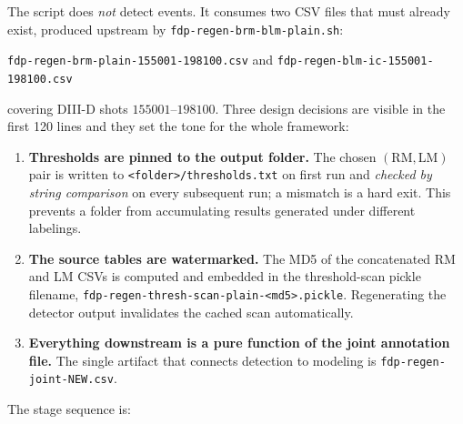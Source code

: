 \documentclass[11pt,a4paper]{article}
\newcommand{\code}[1]{\texttt{\small #1}}
\newcommand{\bk}{\discretionary{}{}{}}   %
\begin{document}
The script does \emph{not} detect events. It consumes two CSV files that must already exist,
produced upstream by \code{fdp-\bk regen-\bk brm-\bk blm-\bk plain.sh}:

\begin{center}
\code{fdp-\bk regen-\bk brm-\bk plain-\bk 155001-\bk 198100.csv} \quad and \quad \code{fdp-\bk regen-\bk blm-\bk ic-\bk 155001-\bk 198100.csv}
\end{center}

covering DIII-D shots $155001$--$198100$. Three design decisions are visible in the first 120 lines
and they set the tone for the whole framework:

\begin{enumerate}[leftmargin=2em]
\item \textbf{Thresholds are pinned to the output folder.} The chosen $(\text{RM},\text{LM})$ pair is
written to \code{<folder>/thresholds.txt} on first run and \emph{checked by string comparison} on
every subsequent run; a mismatch is a hard exit. This prevents a folder from accumulating results
generated under different labelings.
\item \textbf{The source tables are watermarked.} The MD5 of the concatenated RM and LM CSVs is
computed and embedded in the threshold-scan pickle filename,
\code{fdp-\bk regen-\bk thresh-\bk scan-\bk plain-\bk <md5>.pickle}. Regenerating the detector output invalidates the
cached scan automatically.
\item \textbf{Everything downstream is a pure function of the joint annotation file.} The single
artifact that connects detection to modeling is \code{fdp-regen-joint-NEW.csv}.
\end{enumerate}

The stage sequence is:
\end{document}
